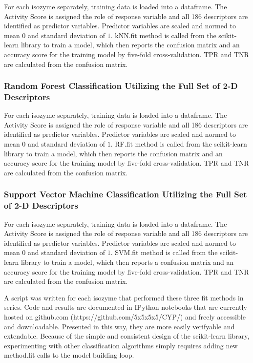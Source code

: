 For each isozyme separately, training data is loaded into a dataframe. The Activity Score is assigned the role of response variable and all 186 descriptors are identified as predictor variables. Predictor variables are scaled and normed to mean $0$ and standard deviation of $1$. kNN.fit method is called from the scikit-learn library to train a model, which then reports the confusion matrix and an accuracy score for the training model by five-fold cross-validation. TPR and TNR are calculated from the confusion matrix.

\subsubsection{Random Forest Classification Utilizing the Full Set of 2-D Descriptors}
For each isozyme separately, training data is loaded into a dataframe. The Activity Score is assigned the role of response variable and all 186 descriptors are identified as predictor variables. Predictor variables are scaled and normed to mean $0$ and standard deviation of $1$. RF.fit method is called from the scikit-learn library to train a model, which then reports the confusion matrix and an accuracy score for the training model by five-fold cross-validation. TPR and TNR are calculated from the confusion matrix.

\subsubsection{Support Vector Machine Classification Utilizing the Full Set of 2-D Descriptors}
For each isozyme separately, training data is loaded into a dataframe. The Activity Score is assigned the role of response variable and all 186  descriptors are identified as predictor variables. Predictor variables are scaled and normed to mean $0$ and standard deviation of $1$. SVM.fit method is called from the scikit-learn library to train a model, which then reports a confusion matrix and an accuracy score for the training model by five-fold cross-validation. TPR and TNR are calculated from the confusion matrix.

A script was written for each isozyme that performed these three fit methods in series. Code and results are documented in IPython notebooks that are currently hosted on github.com (https://github.com/5x5x5x5/CYP/) and freely accessible and downloadable. Presented in this way, they are more easily verifyable and extendable.  Because of the simple and consistent design of the scikit-learn library, experimenting with other classification algorithms simply requires adding new method.fit calls to the model building loop.


